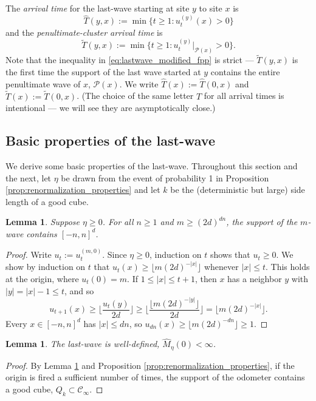 \documentclass[aap]{imsart}
\newtheorem{lemma}[theorem]{Lemma}
\begin{document}
The {\it arrival time} for the last-wave starting at site $y$ to site $x$ is
\begin{equation} \label{eq:lastwave_fpp}
\hat{T}(y,x) := \min\{ t \geq 1 : u_{t}^{(y)}(x) > 0\}
\end{equation}
and the {\it penultimate-cluster arrival time} is 
\begin{equation} \label{eq:lastwave_modified_fpp}
\tilde{T}(y,x) := \min\{ t \geq 1 : u_{t}^{(y)}|_{\mathcal{P}(x)} > 0\}. 
\end{equation}
Note that the inequality in \eqref{eq:lastwave_modified_fpp} is strict --- $\tilde{T}(y,x)$ is the first time
the support of the last wave started at $y$ contains the entire penultimate wave of $x$, $\mathcal{P}(x)$. 
We write $\hat{T}(x) := \hat{T}(0,x)$ and $\tilde{T}(x) := \tilde{T}(0,x)$.
(The choice of the same letter $T$ for all arrival times is intentional --- we will see they are asymptotically close.)

\subsection{Basic properties of the last-wave} \label{sec:last_wave_basic_properties}
We derive some basic properties of the last-wave. Throughout this section and the next, let $\eta$ be drawn from the event of probability
1 in Proposition \ref{prop:renormalization_properties} and let $k$ be the (deterministic but large) side length of a good cube.
\begin{lemma} \label{lemma:square_lower_bound}
	Suppose $\eta \geq 0$. For all $n \geq 1$ and $m \geq (2d)^{d n}$, the support of the $m$-wave contains $[-n,n]^d$. 
\end{lemma}
\begin{proof}
	Write $u_t := u_t^{(m,0)}$. Since $\eta \geq 0$, induction on $t$ shows that $u_t \geq 0$. We show by induction on $t$ that $u_t(x) \geq \lfloor m (2d)^{-|x|} \rfloor$ whenever $|x| \leq t$. This holds at the origin, where $u_t(0) = m$. If $1 \leq |x| \leq t + 1$, then $x$ has a neighbor $y$ with $|y| = |x| - 1 \leq t$, and so
	\[
	u_{t+1}(x) \geq \lfloor \frac{u_t(y)}{2d} \rfloor \geq \lfloor \frac{\lfloor m (2d)^{-|y|} \rfloor}{2d} \rfloor = \lfloor m (2d)^{-|x|} \rfloor.
	\]
	Every $x \in [-n,n]^d$ has $|x| \leq d n$, so $u_{dn}(x) \geq \lfloor m (2d)^{-dn} \rfloor \geq 1$.
\end{proof}





\begin{lemma} \label{lemma:finite_exploding}
	The last-wave is well-defined, $\hat{M}_{\eta}(0) < \infty$.
\end{lemma}
\begin{proof}
	By Lemma \ref{lemma:square_lower_bound}
	and Proposition \ref{prop:renormalization_properties}, if the origin is fired a sufficient number of times, the support of the odometer contains a good cube, $Q_k \subset \mathcal{C}_{\infty}$.
\end{proof}
\end{document}

